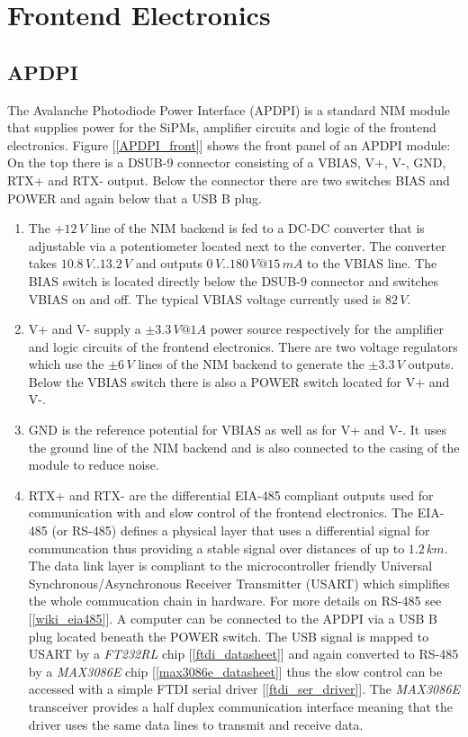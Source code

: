 \section{Frontend Electronics}
\subsection{APDPI}

The Avalanche Photodiode Power Interface (APDPI) is a standard NIM module that supplies power for the SiPMs, amplifier circuits and logic of the frontend electronics.
Figure [\ref{APDPI_front}] shows the front panel of an APDPI module: On the top there is a DSUB-9 connector consisting of a VBIAS, V+, V-, GND, RTX+ and RTX- output.
Below the connector there are two switches BIAS and POWER and again below that a USB B plug.

	\begin{enumerate}

		\item The $+12\,V$ line of the NIM backend is fed to a DC-DC converter that is adjustable via a potentiometer located next to the converter.
		The converter takes $10.8\,V .. 13.2\,V$ and outputs $0\,V .. 180\,V@15\,mA$ to the VBIAS line. The BIAS switch is located directly below the DSUB-9 connector
		and switches VBIAS on and off. The typical VBIAS voltage currently used is $82\,V$.

		\item V+ and V- supply a $\pm3.3\,V@1A$ power source respectively for the amplifier and logic circuits of the frontend electronics. There are two voltage regulators 
		which use the $\pm6\,V$ lines of the NIM backend to generate the $\pm3.3\,V$ outputs. Below the VBIAS switch there is also a POWER switch located for V+ and V-.

		\item GND is the reference potential for VBIAS as well as for V+ and V-. It uses the ground line of the NIM backend and is also connected to the casing of the 
		module to reduce noise.

		\item RTX+ and RTX- are the differential EIA-485 compliant outputs used for communication with and slow control of the frontend electronics. The EIA-485 (or RS-485) 
		defines a physical layer that uses a differential signal for communcation thus providing a stable signal over distances of up to $1.2\,km$. The data link layer is 
		compliant to the microcontroller friendly Universal Synchronous/Asynchronous Receiver Transmitter (USART) which simplifies the whole commucation chain in hardware. 
		For more details on RS-485 see [\ref{wiki_eia485}].
		A computer can be connected to the APDPI via a USB B plug located beneath the POWER switch. The USB signal is mapped to USART by a \emph{FT232RL} 
		chip [\ref{ftdi_datasheet}] and again converted to RS-485 by a \emph{MAX3086E} chip [\ref{max3086e_datasheet}] thus the slow control can be accessed with a simple 
		FTDI serial driver [\ref{ftdi_ser_driver}].
		The \emph{MAX3086E} transceiver provides a half duplex communication interface meaning that the driver uses the same data lines to transmit and receive data.
	
	\end{enumerate}


